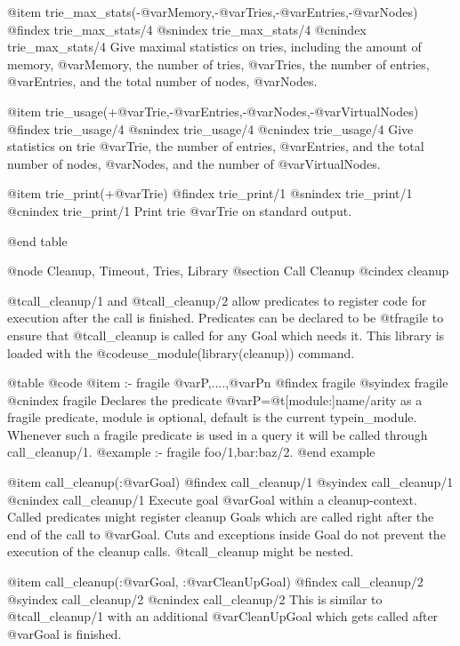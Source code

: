 {{{{{{{{{@item trie_max_stats(-@var{Memory},-@var{Tries},-@var{Entries},-@var{Nodes})
@findex trie_max_stats/4
@snindex trie_max_stats/4
@cnindex trie_max_stats/4
Give maximal statistics on tries, including the amount of memory,
@var{Memory}, the number of tries, @var{Tries}, the number of entries,
@var{Entries}, and the total number of nodes, @var{Nodes}.


@item trie_usage(+@var{Trie},-@var{Entries},-@var{Nodes},-@var{VirtualNodes})
@findex trie_usage/4
@snindex trie_usage/4
@cnindex trie_usage/4
Give statistics on trie @var{Trie}, the number of entries,
@var{Entries}, and the total number of nodes, @var{Nodes}, and the
number of @var{VirtualNodes}.

@item trie_print(+@var{Trie})
@findex trie_print/1
@snindex trie_print/1
@cnindex trie_print/1
Print trie @var{Trie} on standard output.




@end table


@node Cleanup, Timeout, Tries, Library
@section Call Cleanup
@cindex cleanup

@t{call_cleanup/1} and @t{call_cleanup/2} allow predicates to register
code for execution after the call is finished. Predicates can be
declared to be @t{fragile} to ensure that @t{call_cleanup} is called
for any Goal which needs it. This library is loaded with the
@code{use_module(library(cleanup))} command.

@table @code
@item :- fragile @var{P},....,@var{Pn}
@findex fragile
@syindex fragile
@cnindex fragile
Declares the predicate @var{P}=@t{[module:]name/arity} as a fragile
predicate, module is optional, default is the current
typein_module. Whenever such a fragile predicate is used in a query
it will be called through call_cleanup/1.
@example
:- fragile foo/1,bar:baz/2.
@end example

@item call_cleanup(:@var{Goal})
@findex call_cleanup/1
@syindex call_cleanup/1
@cnindex call_cleanup/1
Execute goal @var{Goal} within a cleanup-context. Called predicates
might register cleanup Goals which are called right after the end of
the call to @var{Goal}. Cuts and exceptions inside Goal do not prevent the
execution of the cleanup calls. @t{call_cleanup} might be nested.

@item call_cleanup(:@var{Goal}, :@var{CleanUpGoal})
@findex call_cleanup/2
@syindex call_cleanup/2
@cnindex call_cleanup/2
This is similar to @t{call_cleanup/1} with an additional
@var{CleanUpGoal} which gets called after @var{Goal} is finished.

}}}}}}}}}
